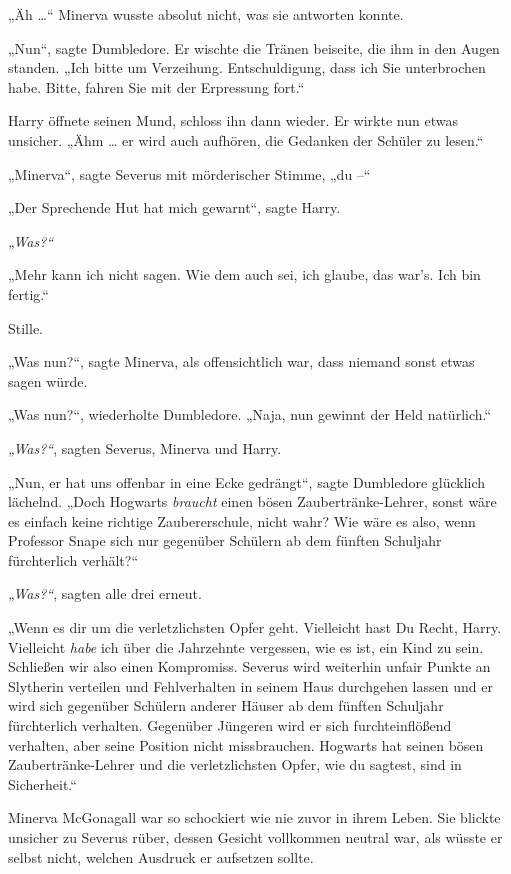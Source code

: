 „Äh …“ Minerva wusste absolut nicht, was sie antworten konnte. 

„Nun“, sagte Dumbledore. Er wischte die Tränen beiseite, die ihm in den Augen standen. „Ich bitte um Verzeihung. Entschuldigung, dass ich Sie unterbrochen habe. Bitte, fahren Sie mit der Erpressung fort.“ 

Harry öffnete seinen Mund, schloss ihn dann wieder. Er wirkte nun etwas unsicher. „Ähm … er wird auch aufhören, die Gedanken der Schüler zu lesen.“ 

„Minerva“, sagte Severus mit mörderischer Stimme, „du –“ 

„Der Sprechende Hut hat mich gewarnt“, sagte Harry. 

\emph{„Was?“} 

„Mehr kann ich nicht sagen. Wie dem auch sei, ich glaube, das war’s. Ich bin fertig.“ 

Stille. 

„Was nun?“, sagte Minerva, als offensichtlich war, dass niemand sonst etwas sagen würde. 

„Was nun?“, wiederholte Dumbledore. „Naja, nun gewinnt der Held natürlich.“ 

\emph{„Was?“}, sagten Severus, Minerva und Harry. 

„Nun, er hat uns offenbar in eine Ecke gedrängt“, sagte Dumbledore glücklich lächelnd. „Doch Hogwarts \emph{braucht} einen bösen Zaubertränke-Lehrer, sonst wäre es einfach keine richtige Zaubererschule, nicht wahr? Wie wäre es also, wenn Professor Snape sich nur gegenüber Schülern ab dem fünften Schuljahr fürchterlich verhält?“ 

\emph{„Was?“}, sagten alle drei erneut. 

„Wenn es dir um die verletzlichsten Opfer geht. Vielleicht hast Du Recht, Harry. Vielleicht \emph{habe} ich über die Jahrzehnte vergessen, wie es ist, ein Kind zu sein. Schließen wir also einen Kompromiss. Severus wird weiterhin unfair Punkte an Slytherin verteilen und Fehlverhalten in seinem Haus durchgehen lassen und er wird sich gegenüber Schülern anderer Häuser ab dem fünften Schuljahr fürchterlich verhalten. Gegenüber Jüngeren wird er sich furchteinflößend verhalten, aber seine Position nicht missbrauchen. Hogwarts hat seinen bösen Zaubertränke-Lehrer und die verletzlichsten Opfer, wie du sagtest, sind in Sicherheit.“ 

Minerva McGonagall war so schockiert wie nie zuvor in ihrem Leben. Sie blickte unsicher zu Severus rüber, dessen Gesicht vollkommen neutral war, als wüsste er selbst nicht, welchen Ausdruck er aufsetzen sollte. 

